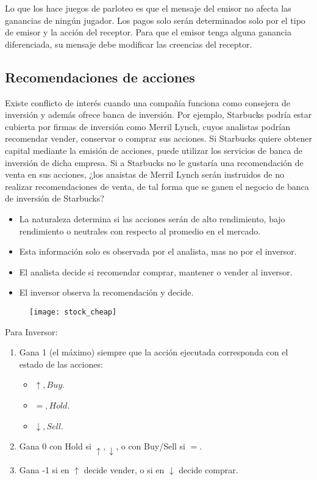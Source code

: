 \documentclass[12pt]{article}
\begin{document}
Lo que los hace juegos de parloteo es que el mensaje del emisor no afecta las ganancias de ningún jugador. Los pagos solo serán determinados solo por el tipo de emisor y la acción del receptor. Para que el emisor tenga alguna ganancia diferenciada, su mensaje debe modificar las creencias del receptor.

\subsection{Recomendaciones de acciones}

Existe conflicto de interés cuando una compañía funciona como consejera de inversión y además ofrece banca de inversión. Por ejemplo, Starbucks podría estar cubierta por firmas de inversión como Merril Lynch, cuyos analistas podrían recomendar vender, conservar o comprar sus acciones. Si Starbucks quiere obtener capital mediante la emisión de acciones, puede utilizar los servicios de banca de inversión de dicha empresa. Si a Starbucks no le gustaría una recomendación de venta en sus acciones, ¿los anaistas de Merril Lynch serán instruidos de no realizar recomendaciones de venta, de tal forma que se ganen el negocio de banca de inversión de Starbucks?

\begin{itemize}
	\setlength{\itemsep}{0pt}
	\setlength{\parskip}{0pt}
	\setlength{\parsep}{0pt}
	\item La naturaleza determina si las acciones serán de alto rendimiento, bajo rendimiento o neutrales con respecto al promedio en el mercado.
	\item Esta información solo es observada por el analista, mas no por el inversor.
	\item El analista decide si recomendar comprar, mantener o vender al inversor.
	\item El inversor observa la recomendación y decide.
\end{itemize}

\begin{figure}[H]
	\centering
	\texttt{[image: stock\_cheap]}
	\label{fig:figX}
\end{figure}

Para Inversor:

\begin{enumerate}
	\setlength{\itemsep}{0pt}
	\setlength{\parskip}{0pt}
	\setlength{\parsep}{0pt}
	\item Gana 1 (el máximo) siempre que la acción ejecutada corresponda con el estado de las acciones: \begin{itemize}
		\setlength{\itemsep}{0pt}
		\setlength{\parskip}{0pt}
		\setlength{\parsep}{0pt}
		\item $ \uparrow, Buy $.
		\item $ =, Hold $.
		\item $ \downarrow, Sell $.
	\end{itemize}
	\item Gana 0 con Hold si $ \uparrow , \downarrow  $, o con Buy/Sell si $ = $.
	\item Gana -1 si en $ \uparrow  $ decide vender, o si en $ \downarrow $ decide comprar. 
\end{enumerate}
\end{document}
